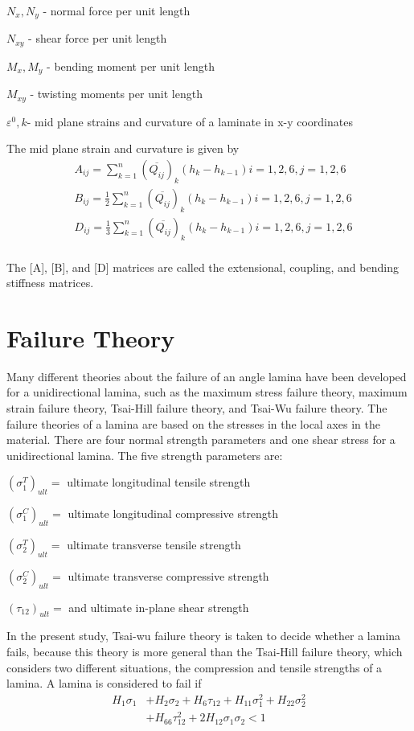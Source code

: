 \documentclass[USenglish,twocolumn]{article}
\begin{document}
$N_x,N_y $  - normal force per unit length

$N_{xy} $  - shear force per unit length

$M_x, M_y $ - bending moment per unit length

$M_{xy} $  - twisting moments per unit length

$\varepsilon^{0}, k $- mid plane strains and curvature of a laminate in x-y coordinates

The mid plane strain and curvature is given by
\begin{equation}
    \begin{split}
    &A_{ij}=\sum_{k=1}^{n}(\overline{Q_{ij}})_k(h_k-h_{k-1})  i=1,2,6, j=1,2,6\\
    &B_{ij}=\frac{1}{2}\sum_{k=1}^{n}(\overline{Q_{ij}})_k(h_k-h_{k-1})  i=1,2,6, j=1,2,6\\
    &D_{ij}=\frac{1}{3}\sum_{k=1}^{n}(\overline{Q_{ij}})_k(h_k-h_{k-1}) i=1,2,6, j=1,2,6\\
    \end{split}
\end{equation}

The [A], [B], and [D] matrices are called the extensional, coupling, and bending stiffness matrices.


\section{Failure Theory}
Many different theories about the failure of an angle lamina have been developed for a
unidirectional lamina, such as the maximum stress failure theory, maximum strain failure theory,
Tsai-Hill failure theory, and Tsai-Wu failure theory. The failure theories of a lamina are based on
the stresses in the local axes in the material. There are four normal strength parameters and one shear
stress for a unidirectional lamina. The five strength parameters are:

$(\sigma _1^{T})_{ult}= $ ultimate longitudinal tensile strength

$(\sigma _1^{C})_{ult}= $ ultimate longitudinal compressive strength

$(\sigma _2^{T})_{ult}= $ ultimate transverse tensile strength

$(\sigma _2^{C})_{ult}= $ ultimate transverse compressive strength 

$(\tau_{12})_{ult}= $ and ultimate in-plane shear strength

In the present study, Tsai-wu failure theory is taken to decide whether a lamina fails,
because this theory is more general than the Tsai-Hill failure theory, which considers two
different situations, the compression and tensile strengths of a lamina. A lamina is considered to fail
if \begin{equation} \label{eq:tsai_wu}
\begin{split}
	H_1 \sigma_1  & + H_2 \sigma_2 + H_6 \tau_{12} + H_{11}\sigma_1^2 + H_{22} \sigma_2^2 \\
				  & + H_{66}  \tau_{12}^2 + 2H_{12}\sigma_1\sigma_2 < 1
\end{split}
\end{equation}
\end{document}
